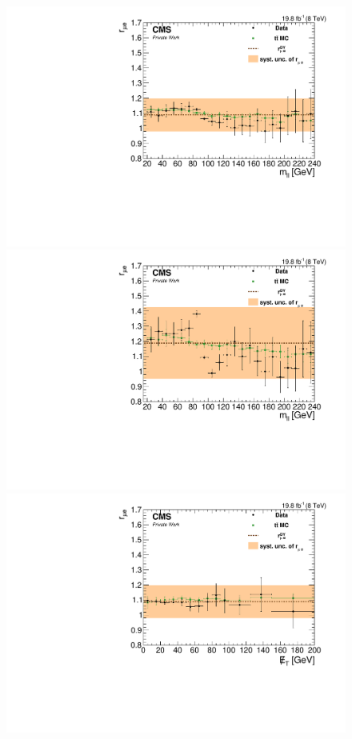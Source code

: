 \begin{figure}[htbp]
\centering
\begin{minipage}[t]{0.49\textwidth}
  \includegraphics[width=\textwidth]{plots/BG/rmue/8TeVrRatioDataVsMCControl_mll_Central_Full2012.pdf}
\end{minipage}
\begin{minipage}[t]{0.49\textwidth}
\includegraphics[width=\textwidth]{plots/BG/rmue/8TeVrRatioDataVsMCControl_mll_Forward_Full2012.pdf}
\end{minipage}
\begin{minipage}[t]{0.49\textwidth}
  \includegraphics[width=\textwidth]{plots/BG/rmue/8TeVrRatioDataVsMCControl_met_Central_Full2012.pdf}

\end{minipage}
\end{figure}
